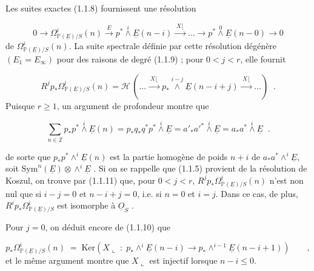 Les suites exactes (1.1.8) fournissent une résolution

\begin{equation}\tag{1.1.10}
0 \longrightarrow \Omega^i_{\mathbb{P}(\underline{E})/S}(n) \xrightarrow{\;E\;} p^* \overset{i}{\wedge} \underline{E}(n-i) \xrightarrow{\;X\lfloor\;} \ldots \longrightarrow p^* \overset{0}{\wedge} \underline{E}(n-0) \longrightarrow 0
\end{equation}
de $\Omega^i_{\mathbb{P}(\underline{E})/S}(n)$. La suite spectrale définie par cette résolution dégénère $(E_1 = E_\infty)$ pour des raisons de degré (1.1.9) ; pour $0 < j < r$, elle fournit

\begin{equation}\tag{1.1.11}
R^j p_* \Omega^i_{\mathbb{P}(\underline{E})/S}(n) = \mathcal{H} \, ( \ldots \xrightarrow{\;X\lfloor\;} p_* \overset{i-j}{\wedge} \underline{E}(n-i+j) \xrightarrow{\;X\lfloor\;} \ldots ) \;\; .
\end{equation}
Puisque $r \geq 1$, un argument de profondeur montre que

\begin{equation}\tag{1.1.12}
\sum_{n \in \mathbb{Z}} p_*p^* \overset{i}{\wedge} \underline{E}(n) = p_*q_*q^*p^* \overset{i}{\wedge} \underline{E} = {a'}_{*}{a'}^{*} \overset{i}{\wedge} \underline{E} = a_*a^* \overset{i}{\wedge} \underline{E} \;\; .
\end{equation}


 de sorte que $p_*p^* \wedge^i \underline{E}(n)$ est la partie homogène de poids $n + i$ de $a_*a^* \wedge^i \underline{E}$, soit $\mathrm{Sym}^n(\underline{E}) \otimes \wedge^i \underline{E}$ . Si on se rappelle que (1.1.5) provient de la résolution de Koszul, on trouve par (1.1.11) que, pour $0 < j < r$, $R^j p_* \Omega^i_{\mathbb{P}(\underline{E})/S}(n)$ n'est non nul que si $i-j = 0$ et $n-i+j = 0$, i.e. si $n = 0$ et $i = j$. Dans ce cas, de plus, $R^i p_* \Omega^i_{\mathbb{P}(\underline{E})/S}$ est isomorphe à $\underline{O}_S$ .

Pour $j = 0$, on déduit encore de (1.1.10) que

\begin{equation}\tag{1.1.13}
p_*\Omega^i_{\mathbb{P}(\underline{E})/S}(n) \;=\; \mathrm{Ker}(X \llcorner \;:\; p_* \wedge^i \underline{E}(n-i) \longrightarrow p_* \wedge^{i-1} \underline{E}(n-i+1)) \qquad ,
\end{equation}
et le même argument montre que $X \llcorner$ est injectif lorsque $n-i \leq 0$.

